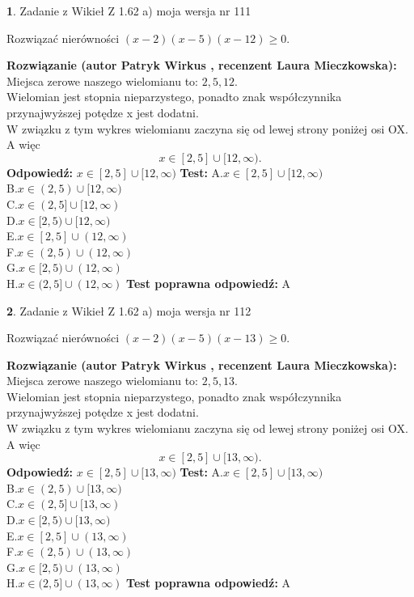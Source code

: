 \documentclass[12pt, a4paper]{article}
\theoremstyle{definition} %
\newtheorem{zad}{}
\newcommand{\zadStart}[1]{\begin{zad}#1\newline}
\newcommand{\zadStop}{\end{zad}}
\newcommand{\rozwStart}[2]{\noindent \textbf{Rozwiązanie (autor #1 , recenzent #2): }\newline}
\newcommand{\rozwStop}{\newline}
\newcommand{\odpStart}{\noindent \textbf{Odpowiedź:}\newline}
\newcommand{\odpStop}{\newline}
\newcommand{\testStart}{\noindent \textbf{Test:}\newline}
\newcommand{\testStop}{\newline}
\newcommand{\kluczStart}{\noindent \textbf{Test poprawna odpowiedź:}\newline}
\newcommand{\kluczStop}{\newline}
\begin{document}
\zadStart{Zadanie z Wikieł Z 1.62 a) moja wersja nr 111}

Rozwiązać nierówności $(x-2)(x-5)(x-12)\ge0$.
\zadStop
\rozwStart{Patryk Wirkus}{Laura Mieczkowska}
Miejsca zerowe naszego wielomianu to: $2, 5, 12$.\\
Wielomian jest stopnia nieparzystego, ponadto znak współczynnika przy\linebreak najwyższej potędze x jest dodatni.\\ W związku z tym wykres wielomianu zaczyna się od lewej strony poniżej osi OX. A więc $$x \in [2,5] \cup [12,\infty).$$
\rozwStop
\odpStart
$x \in [2,5] \cup [12,\infty)$
\odpStop
\testStart
A.$x \in [2,5] \cup [12,\infty)$\\
B.$x \in (2,5) \cup [12,\infty)$\\
C.$x \in (2,5] \cup [12,\infty)$\\
D.$x \in [2,5) \cup [12,\infty)$\\
E.$x \in [2,5] \cup (12,\infty)$\\
F.$x \in (2,5) \cup (12,\infty)$\\
G.$x \in [2,5) \cup (12,\infty)$\\
H.$x \in (2,5] \cup (12,\infty)$
\testStop
\kluczStart
A
\kluczStop



\zadStart{Zadanie z Wikieł Z 1.62 a) moja wersja nr 112}

Rozwiązać nierówności $(x-2)(x-5)(x-13)\ge0$.
\zadStop
\rozwStart{Patryk Wirkus}{Laura Mieczkowska}
Miejsca zerowe naszego wielomianu to: $2, 5, 13$.\\
Wielomian jest stopnia nieparzystego, ponadto znak współczynnika przy\linebreak najwyższej potędze x jest dodatni.\\ W związku z tym wykres wielomianu zaczyna się od lewej strony poniżej osi OX. A więc $$x \in [2,5] \cup [13,\infty).$$
\rozwStop
\odpStart
$x \in [2,5] \cup [13,\infty)$
\odpStop
\testStart
A.$x \in [2,5] \cup [13,\infty)$\\
B.$x \in (2,5) \cup [13,\infty)$\\
C.$x \in (2,5] \cup [13,\infty)$\\
D.$x \in [2,5) \cup [13,\infty)$\\
E.$x \in [2,5] \cup (13,\infty)$\\
F.$x \in (2,5) \cup (13,\infty)$\\
G.$x \in [2,5) \cup (13,\infty)$\\
H.$x \in (2,5] \cup (13,\infty)$
\testStop
\kluczStart
A
\kluczStop
\end{document}
